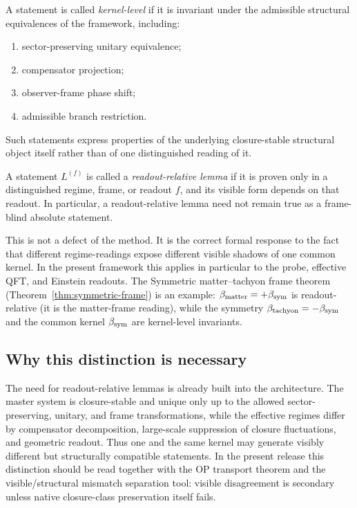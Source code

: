 \begin{definition}
\label{def:kernel-level-statement}
A statement is called \emph{kernel-level} if it is invariant under the
admissible structural equivalences of the framework, including:
\begin{enumerate}[label=(\roman*)]
 \item sector-preserving unitary equivalence;
 \item compensator projection;
 \item observer-frame phase shift;
 \item admissible branch restriction.
\end{enumerate}
Such statements express properties of the underlying closure-stable
structural object itself rather than of one distinguished reading of it.
\end{definition}

\begin{definition}
\label{def:readout-relative-lemma}
A statement $L^{(f)}$ is called a \emph{readout-relative lemma} if it
is proven only in a distinguished regime, frame, or readout $f$, and its
visible form depends on that readout. In particular, a readout-relative
lemma need not remain true as a frame-blind absolute statement.
\end{definition}

\begin{remark}
This is not a defect of the method. It is the correct formal response to
the fact that different regime-readings expose different visible shadows
of one common kernel. In the present framework this applies in particular
to the probe, effective QFT, and Einstein readouts.
The Symmetric matter--tachyon frame theorem (Theorem~\ref{thm:symmetric-frame})
is an example: $\beta_{\mathrm{matter}} = +\beta_{\mathrm{sym}}$ is readout-relative
(it is the matter-frame reading), while the symmetry
$\beta_{\mathrm{tachyon}} = -\beta_{\mathrm{sym}}$ and the common kernel $\beta_{\mathrm{sym}}$ are
kernel-level invariants.
\end{remark}

\subsection*{Why this distinction is necessary}

The need for readout-relative lemmas is already built into the
architecture. The master system is closure-stable and unique only up to
the allowed sector-preserving, unitary, and frame transformations, while
the effective regimes differ by compensator decomposition, large-scale
suppression of closure fluctuations, and geometric readout. Thus one and
the same kernel may generate visibly different but structurally
compatible statements. In the present release this distinction should be read together with the OP transport theorem and the visible/structural mismatch separation tool: visible disagreement is secondary unless native closure-class preservation itself fails.

